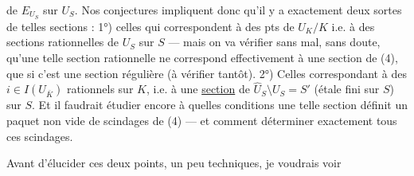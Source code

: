 de $E_{U_S}$ sur $U_S$. Nos conjectures impliquent donc qu'il y a exactement deux sortes de telles sections : 1°) celles qui correspondent à des pts de $U_K/K$ i.e. à des sections rationnelles de $U_S$ sur $S$ — mais on va vérifier sans mal, sans doute, qu'une telle section rationnelle ne correspond effectivement à une section de  (4), que si c'est une section  régulière (à vérifier tantôt). 2°) Celles correspondant à des $i\in I(U_{\bar K})$ rationnels sur $K$, i.e. à une \uline{section} de $\widehat U_S\setminus U_S=S'$ (étale fini sur $S$) sur $S$. Et il faudrait étudier encore à quelles conditions une telle section définit un paquet non vide de scindages de (4) — et comment déterminer exactement tous ces scindages.

Avant d'élucider ces deux points, un peu techniques, je voudrais voir
